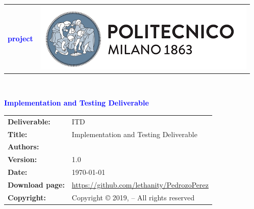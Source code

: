 




\begin{titlepage}



{\begin{table}[t!]
\centering
\begin{tabu} to \textwidth { X[1.3,r,p] X[1.7,l,p] }
\textcolor{Blue}
{\textbf{\small{\projectName{} project \newline \names{}}}} & \includegraphics[scale=0.5]{Images/PolimiLogo}
\end{tabu}
\end{table}}~\\ [7cm]


\begin{flushleft}

{\textcolor{Blue}{\textbf{\Huge{Implementation and Testing Deliverable}}}} \\ [1cm]

\end{flushleft}

\end{titlepage}

\begin{table}[h!]
\begin{tabu} to \textwidth { X[0.3,r,p] X[0.7,l,p] }
\hline

\textbf{Deliverable:} & ITD\\
\textbf{Title:} & Implementation and Testing Deliverable \\
\textbf{Authors:} & \names{} \\
\textbf{Version:} & 1.0 \\ 
\textbf{Date:} & \today \\
\textbf{Download page:} & \url{https://github.com/lethanity/PedrozoPerez} \\
\textbf{Copyright:} & Copyright © 2019, \names{}  – All rights reserved \\
\hline
\end{tabu}
\end{table}




